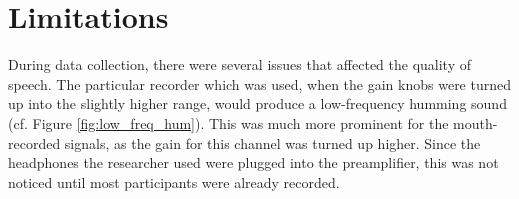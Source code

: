 
\section{Limitations}
\label{chap2:limitations}

During data collection, there were several issues that affected the quality of speech.  
The particular recorder which was used, when the gain knobs were turned up into the slightly higher range, would produce a low-frequency humming sound (cf. Figure \ref{fig:low_freq_hum}).  This was much more prominent for the mouth-recorded signals, as the gain for this channel was turned up higher.  Since the headphones the researcher used were plugged into the preamplifier, this was not noticed until most participants were already recorded.


